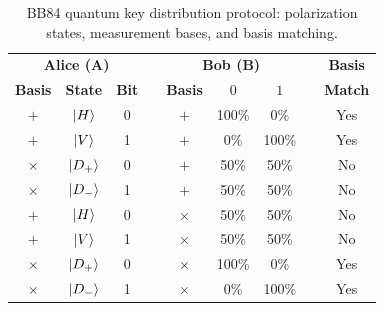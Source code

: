 \begin{table}[H]
\centering
\begin{tabular}{@{}ccclccclc@{}}
\cmidrule(r){1-3} \cmidrule(lr){5-7} \cmidrule(l){9-9}
\multicolumn{3}{c}{\textbf{Alice (A)}}         &  & \multicolumn{3}{c}{\textbf{Bob (B)}} &  & \textbf{Basis} \\ \cmidrule(r){1-3} \cmidrule(lr){5-7} \cmidrule(l){9-9} 
\textbf{Basis} & \textbf{State} & \textbf{Bit} &  & \textbf{Basis}   & $0$     & $1$     &  & \textbf{Match} \\ \cmidrule(r){1-3} \cmidrule(lr){5-7} \cmidrule(l){9-9} 
$+$            & $\ket{H}$      & 0            &  & $+$              & 100\%   & 0\%     &  & Yes            \\
$+$            & $\ket{V}$      & 1            &  & $+$              & 0\%     & 100\%   &  & Yes            \\
$\times$       & $\ket{D_+}$    & 0            &  & $+$              & 50\%    & 50\%    &  & No             \\
$\times$       & $\ket{D_-}$    & 1            &  & $+$              & 50\%    & 50\%    &  & No             \\
$+$            & $\ket{H}$      & 0            &  & $\times$         & 50\%    & 50\%    &  & No             \\
$+$            & $\ket{V}$      & 1            &  & $\times$         & 50\%    & 50\%    &  & No             \\
$\times$       & $\ket{D_+}$    & 0            &  & $\times$         & 100\%   & 0\%     &  & Yes            \\
$\times$       & $\ket{D_-}$    & 1            &  & $\times$         & 0\%     & 100\%   &  & Yes            \\ \cmidrule(r){1-3} \cmidrule(lr){5-7} \cmidrule(l){9-9} 
\end{tabular}
\caption{BB84 quantum key distribution protocol: polarization states, measurement bases, and basis matching.}
\label{tab:5-bb84}
\end{table}
